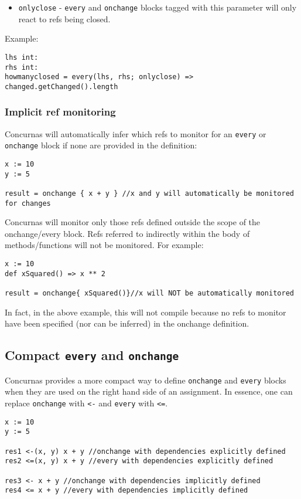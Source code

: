\documentclass[conc-doc]{subfiles}
\begin{document}
\begin{itemize}
	\item \lstinline{onlyclose} - \lstinline{every} and \lstinline{onchange} blocks tagged with this parameter will only react to refs being closed.
\end{itemize}

Example:

\begin{lstlisting}
lhs int:
rhs int:
howmanyclosed = every(lhs, rhs; onlyclose) => changed.getChanged().length
\end{lstlisting}	

\subsubsection{Implicit ref monitoring}
Concurnas will automatically infer which refs to monitor for an \lstinline{every} or \lstinline{onchange} block if none are provided in the definition:
\begin{lstlisting}
x := 10
y := 5

result = onchange { x + y } //x and y will automatically be monitored for changes
\end{lstlisting}

Concurnas will monitor only those refs defined outside the scope of the onchange/every block. Refs referred to indirectly within the body of methods/functions will not be monitored. For example:
\begin{lstlisting}
x := 10
def xSquared() => x ** 2

result = onchange{ xSquared()}//x will NOT be automatically monitored
\end{lstlisting}

In fact, in the above example, this will not compile because no refs to monitor have been specified (nor can be inferred) in the onchange definition.

\subsection{Compact \lstinline{every} and \lstinline{onchange}}
Concurnas provides a more compact way to define \lstinline{onchange} and \lstinline{every} blocks when they are used on the right hand side of an assignment. In essence, one can replace \lstinline{onchange} with \lstinline{<-} and \lstinline{every} with \lstinline{<=}.

\begin{lstlisting}
x := 10
y := 5

res1 <-(x, y) x + y //onchange with dependencies explicitly defined
res2 <=(x, y) x + y //every with dependencies explicitly defined

res3 <- x + y //onchange with dependencies implicitly defined
res4 <= x + y //every with dependencies implicitly defined
\end{lstlisting}
\end{document}
